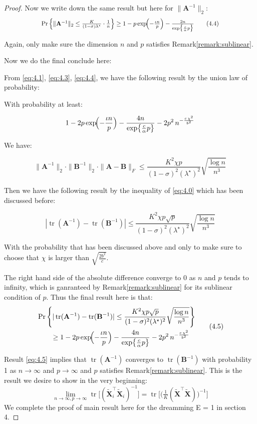 \documentclass[11pt]{article}
\numberwithin{equation}{section}
\theoremstyle{plain}
\theoremstyle{definition}
\theoremstyle{remark}
\begin{document}
\begin{proof}
Now we write down the same result but here for $\|\mathbf{A}^{-1}\|_2$:
\[
\scalebox{0.87}{$
  \Pr\left\{\|\mathbf{A}^{-1}\|_2 \le\frac{K}{(1-\sigma)\lambda^{\star}}\cdot\frac{1}{n}\right\}\ge 1- p\exp\!\Bigl(-\frac{\iota n}{p}\Bigr) - \frac{2 n}{\exp\bigl\{\frac{c}{\alpha} p\bigr\}}\tag{4.4}\label{eq:4.4}
$}
\]

Again, only make sure the dimension $n$ and $p$ satisfies Remark\ref{remark:sublinear}.

Now we do the final conclude here:

From \ref{eq:4.1}, \ref{eq:4.3}, \ref{eq:4.4}, we have the following result by the union law of probability:

With probability at least:

\[
  1 - 2p\exp\!\Bigl(-\frac{\iota n}{p}\Bigr) - \frac{4 n}{\exp\bigl\{\frac{c}{\alpha} p\bigr\}} - 2p^{2}\,n^{-\frac{c\,\chi^{2}}{b^{2}}}
\]

We have:

\[
  \|\mathbf{A}^{-1}\|_2 \cdot \|\mathbf{B}^{-1}\|_2 \cdot \|\mathbf{A}-\mathbf{B}\|_F \le \frac{K^{2}\chi p}{(1-\sigma)^{2}(\lambda^{\star})^{2}} \sqrt{\frac{\log n}{n^3}}
\]

Then we have the following result by the inequality of \ref{eq:4.0} which has been discussed before:

\[
  | \operatorname{tr}(\mathbf{A}^{-1}) - \operatorname{tr}(\mathbf{B}^{-1}) | \leq \frac{K^{2}\chi p\sqrt{p}}{(1-\sigma)^{2}(\lambda^{\star})^{2}} \sqrt{\frac{\log n}{n^3}}
\]

With the probability that has been discussed above and only to make sure to choose that $\chi$ is larger than $\sqrt{\frac{2 b^2}{c}}$.

The right hand side of the absolute difference converge to 0 as $n$ and $p$ tends to infinity, which is ganranteed by Remark\ref{remark:sublinear} for its sublinear condition of $p$.
Thus the final result here is that:
\[
  \begin{aligned}
  &\Pr\left\{|\operatorname{tr}(\mathbf{A}^{-1}) - \operatorname{tr}(\mathbf{B}^{-1})| \leq \frac{K^{2}\chi p\sqrt{p}}{(1-\sigma)^{2}(\lambda^{\star})^{2}} \sqrt{\frac{\log n}{n^3}}\right\} \\
  &\qquad \geq 1 - 2p\exp\!\Bigl(-\frac{\iota n}{p}\Bigr) - \frac{4 n}{\exp\bigl\{\frac{c}{\alpha} p\bigr\}} - 2p^{2}\,n^{-\frac{c\,\chi^{2}}{b^{2}}}
  \end{aligned} \tag{4.5}\label{eq:4.5}
\]

Result \ref{eq:4.5} implies that $\operatorname{tr}(\mathbf{A}^{-1})$ converges to $\operatorname{tr}(\mathbf{B}^{-1})$ with probability 1 as $n\to\infty$ and $p\to\infty$ and $p$ satisfies Remark\ref{remark:sublinear}.
This is the result we desire to show in the very beginning: 
\[
\lim_{n\to\infty,p\to\infty}\operatorname{tr}\bigl[(\tilde{\mathbf{X}}_i^{\top}\tilde{\mathbf{X}}_i)^{-1}\bigr]
  = \operatorname{tr}\bigl[\bigl(\tfrac{1}{K}(\tilde{\mathbf{X}}^{\top}\tilde{\mathbf{X}})\bigr)^{-1}\bigr]
\]
We complete the proof of main result here for the dreamming E = 1 in section 4.

\end{proof}
\end{document}
